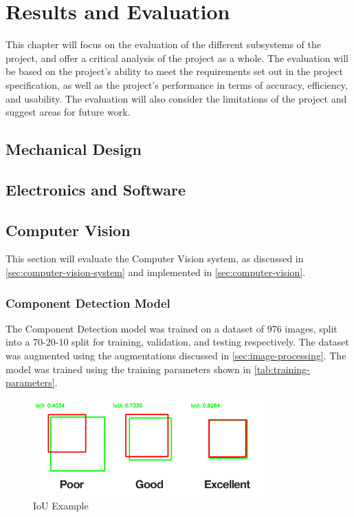 \section{Results and Evaluation}
\label{sec:evaluation}
This chapter will focus on the evaluation of the different subsystems of the project, and offer a critical analysis of the project as a whole. The evaluation will be based on the project's ability to meet the requirements set out in the project specification, as well as the project's performance in terms of accuracy, efficiency, and usability. The evaluation will also consider the limitations of the project and suggest areas for future work.

\subsection{Mechanical Design}

\subsection{Electronics and Software}

\subsection{Computer Vision}
\label{sec:computer-vision-evaluation}
This section will evaluate the Computer Vision system, as discussed in \autoref{sec:computer-vision-system} and implemented in \autoref{sec:computer-vision}.

\subsubsection{Component Detection Model}
The Component Detection model was trained on a dataset of 976 images, split into a 70-20-10 split for training, validation, and testing respectively. The dataset was augmented using the augmentations discussed in \autoref{sec:image-processing}. The model was trained using the training parameters shown in \autoref{tab:training-parameters}.

\begin{figure}[H]
    \centering
    \includegraphics[width=0.8\textwidth]{imgs/articles/iou.png}
    \caption{IoU Example \cite{rosebrock_2016}}
    \label{fig:iou}
  \end{figure}
  
